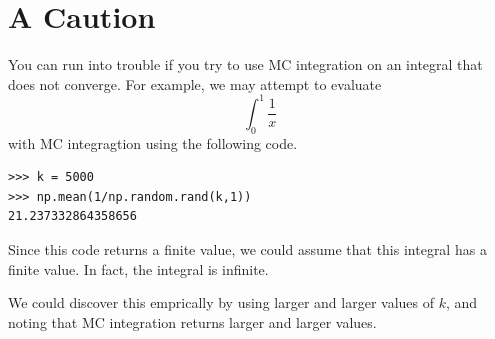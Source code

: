 \section*{A Caution}
You can run into trouble if you try to use MC integration on an integral that does not converge.
For example, we may attempt to evaluate
\[
\int_0^1 \frac{1}{x}
\]
with MC integragtion using the following code.
\begin{lstlisting}
>>> k = 5000
>>> np.mean(1/np.random.rand(k,1))
21.237332864358656
\end{lstlisting}

Since this code returns a finite value, we could assume that this integral has a finite value.
In fact, the integral is infinite.

We could discover this emprically by using larger and larger values of $k$, and noting that MC integration returns larger and larger values.

